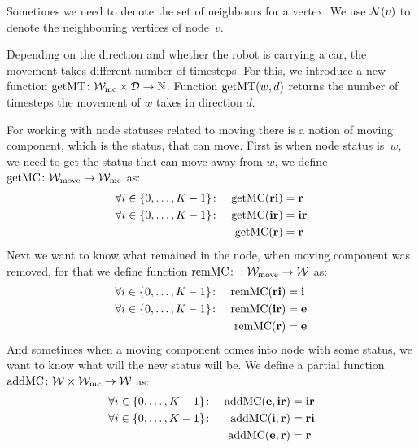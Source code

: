 Sometimes we need to denote the set of neighbours for a vertex. We use $\mathcal{N}(v)$
to denote the neighbouring vertices of node~$v$.

Depending on the direction and whether the robot is carrying a car, the
movement takes different number of timesteps. For this, we introduce a new
function $\mathrm{getMT} \colon \mathcal{W}_\mathrm{mc} \times \mathcal{D} \to \mathbb{N}$. Function $\mathrm{getMT}(w,d)$
returns the number of timesteps the movement of $w$ takes in direction $d$.

For working with node statuses related to moving there is a notion of moving
component, which is the status, that can move. First is when node status
is~$w$, we need to get the status that can move away from $w$, we define
$\mathrm{getMC} \colon \mathcal{W}_\mathrm{move} \to \mathcal{W}_\mathrm{mc}$ as:
\begin{align}
    &\forall i \in \{0,\ldots,K-1\} \colon &\mathrm{getMC}(\text{\bf ri}) &= \text{\bf r}\\
    &\forall i \in \{0,\ldots,K-1\} \colon &\mathrm{getMC}(\text{\bf ir}) &= \text{\bf ir}\\
    & &\mathrm{getMC}(\text{\bf r}) &= \text{\bf r}
\end{align}
Next we want to know what remained in the node, when moving component was
removed, for that we define function $\mathrm{remMC}\colon: \mathcal{W}_\mathrm{move} \to \mathcal{W}$ as:
\begin{align}
    &\forall i \in \{0,\ldots,K-1\} \colon &\mathrm{remMC}(\text{\bf ri}) &= \text{\bf i}\\
    &\forall i \in \{0,\ldots,K-1\} \colon &\mathrm{remMC}(\text{\bf ir}) &= \text{\bf e}\\
    & &\mathrm{remMC}(\text{\bf r}) &= \text{\bf e}
\end{align}
And sometimes when a moving component comes into node with some status, we want
to know what will the new status will be. We define a partial function $\mathrm{addMC}
\colon \mathcal{W} \times \mathcal{W}_\mathrm{mc} \to \mathcal{W}$ as:
\begin{align}
    &\forall i \in \{0,\ldots,K-1\} \colon &\mathrm{addMC}(\text{\bf e},\text{\bf ir}) &=
    \text{\bf ir}\\
    &\forall i \in \{0,\ldots,K-1\} \colon &\mathrm{addMC}(\text{\bf i},\text{\bf r}) &=
    \text{\bf ri}\\
    & &\mathrm{addMC}(\text{\bf e},\text{\bf r}) &= \text{\bf r}
\end{align}

